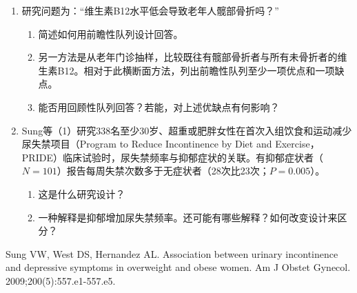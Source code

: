 
\clearpage
{}
\begin{enumerate}
\item 研究问题为：“维生素B12水平低会导致老年人髋部骨折吗？”
\begin{enumerate}
\item 简述如何用前瞻性队列设计回答。
\item 另一方法是从老年门诊抽样，比较既往有髋部骨折者与所有未骨折者的维生素B12。相对于此横断面方法，列出前瞻性队列至少一项优点和一项缺点。
\item 能否用回顾性队列回答？若能，对上述优缺点有何影响？
\end{enumerate}
\item Sung等（1）研究338名至少30岁、超重或肥胖女性在首次入组饮食和运动减少尿失禁项目（Program to Reduce Incontinence by Diet and Exercise，PRIDE）临床试验时，尿失禁频率与抑郁症状的关联。有抑郁症状者（$N=101$）报告每周失禁次数多于无症状者（28次比23次；$P=0.005$）。
\begin{enumerate}
\item 这是什么研究设计？
\item 一种解释是抑郁增加尿失禁频率。还可能有哪些解释？如何改变设计来区分？
\end{enumerate}
\end{enumerate}
\begin{references}
\item Sung VW, West DS, Hernandez AL. Association between urinary incontinence and depressive symptoms in overweight and obese women. Am J Obstet Gynecol. 2009;200(5):557.e1-557.e5.
\end{references}
